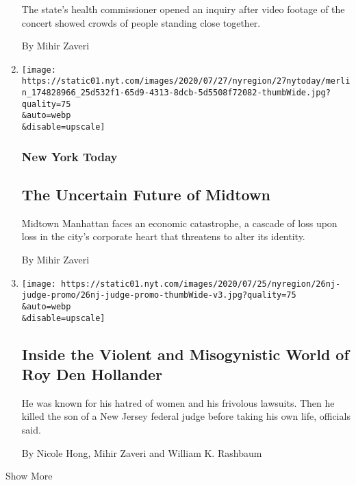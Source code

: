 \begin{enumerate}
  The state's health commissioner opened an inquiry after video footage
  of the concert showed crowds of people standing close together.

  By Mihir Zaveri
\item
  \href{/2020/07/27/nyregion/nyc-midtown-manhattan-coronavirus.html}{}

  \texttt{[image: https://static01.nyt.com/images/2020/07/27/nyregion/27nytoday/merlin\_174828966\_25d532f1-65d9-4313-8dcb-5d5508f72082-thumbWide.jpg?quality=75\\\&auto=webp\\\&disable=upscale]}

  \hypertarget{new-york-today-1}{%
  \subsubsection{New York Today}\label{new-york-today-1}}

  \hypertarget{the-uncertain-future-of-midtown}{%
  \subsection{The Uncertain Future of
  Midtown}\label{the-uncertain-future-of-midtown}}

  Midtown Manhattan faces an economic catastrophe, a cascade of loss
  upon loss in the city's corporate heart that threatens to alter its
  identity.~

  By Mihir Zaveri
\item
  \href{/2020/07/26/nyregion/roy-den-hollander-judge.html}{}

  \texttt{[image: https://static01.nyt.com/images/2020/07/25/nyregion/26nj-judge-promo/26nj-judge-promo-thumbWide-v3.jpg?quality=75\\\&auto=webp\\\&disable=upscale]}

  \hypertarget{inside-the-violent-and-misogynistic-world-of-roy-den-hollander}{%
  \subsection{Inside the Violent and Misogynistic World of Roy Den
  Hollander}\label{inside-the-violent-and-misogynistic-world-of-roy-den-hollander}}

  He was known for his hatred of women and his frivolous lawsuits. Then
  he killed the son of a New Jersey federal judge before taking his own
  life, officials said.

  By Nicole Hong, Mihir Zaveri and William K. Rashbaum
\end{enumerate}

Show More

